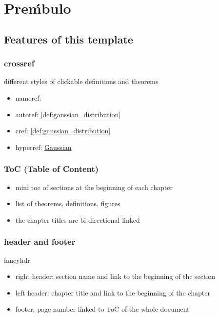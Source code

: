 \chapter*{Pre\'mbulo}
\minitoc


\section{Features of this template}
\subsection{crossref}
different styles of clickable definitions and theorems
\begin{itemize}
	\item nameref:

	\item autoref:
		\autoref{def:gaussian_distribution}

	\item cref:
		\cref{def:gaussian_distribution}

	\item hyperref:
		\hyperref[def:gaussian_distribution]{Gaussian}
\end{itemize}

\subsection{ToC (Table of Content)}
\begin{itemize}
	\item mini toc of sections at the beginning of each chapter
	\item list of theorems, definitions, figures
	\item the chapter titles are bi-directional linked
\end{itemize}

\subsection{header and footer}
fancyhdr
\begin{itemize}
	\item right header: section name and link to the beginning of the section
	\item left header: chapter title and link to the beginning of the chapter
	\item footer: page number linked to ToC of the whole document
\end{itemize}

